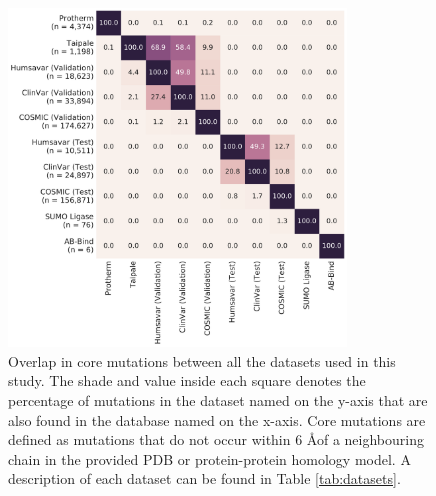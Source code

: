 \clearpage

\begin{figure}[tb]
	\centering
	\includegraphics[width=0.8\textwidth]{static/elaspic_training_set/data_statistics/training_set_overlap_data_df_tt_core.pdf}
	\caption[Overlap in core mutation datasets.]{
		Overlap in core mutations between all the datasets used in this study.
		The shade and value inside each square denotes the percentage of mutations in the dataset named on the y-axis that are also found in the database named on the x-axis.
		Core mutations are defined as mutations that do not occur within 6 \AA of a neighbouring chain in the provided PDB or protein-protein homology model.
		A description of each dataset can be found in Table \ref{tab:datasets}.
	}
	\label{fig:training_set_overlap_core}
\end{figure}

\clearpage

